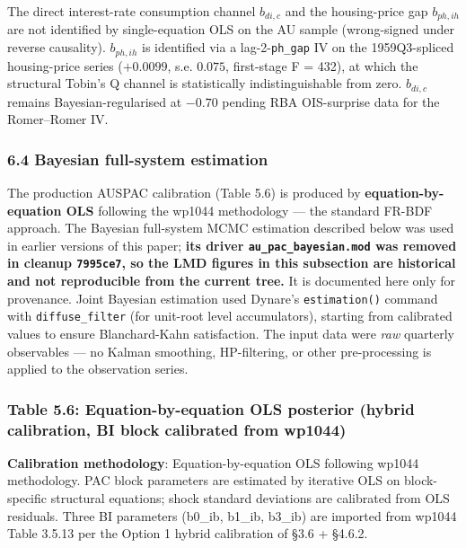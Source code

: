 \documentclass[
]{article}
\begin{document}
The direct interest-rate consumption channel \(b_{di,c}\) and the
housing-price gap \(b_{ph,ih}\) are not identified by single-equation
OLS on the AU sample (wrong-signed under reverse causality).
\(b_{ph,ih}\) is identified via a lag-2-\texttt{ph\_gap} IV on the
1959Q3-spliced housing-price series (\(+0.0099\), s.e. \(0.075\),
first-stage F = 432), at which the structural Tobin's Q channel is
statistically indistinguishable from zero. \(b_{di,c}\) remains
Bayesian-regularised at \(-0.70\) pending RBA OIS-surprise data for the
Romer--Romer IV.

\subsubsection{6.4 Bayesian full-system
estimation}\label{bayesian-full-system-estimation}

The production AUSPAC calibration (Table 5.6) is produced by
\textbf{equation-by-equation OLS} following the wp1044 methodology ---
the standard FR-BDF approach. The Bayesian full-system MCMC estimation
described below was used in earlier versions of this paper; \textbf{its
driver \texttt{au\_pac\_bayesian.mod} was removed in cleanup
\texttt{7995ce7}, so the LMD figures in this subsection are historical
and not reproducible from the current tree.} It is documented here only
for provenance. Joint Bayesian estimation used Dynare's
\texttt{estimation()} command with \texttt{diffuse\_filter} (for
unit-root level accumulators), starting from calibrated values to ensure
Blanchard-Kahn satisfaction. The input data were \emph{raw} quarterly
observables --- no Kalman smoothing, HP-filtering, or other
pre-processing is applied to the observation series.

\subsubsection{Table 5.6: Equation-by-equation OLS posterior (hybrid
calibration, BI block calibrated from
wp1044)}\label{table-5.6-equation-by-equation-ols-posterior-hybrid-calibration-bi-block-calibrated-from-wp1044}

\textbf{Calibration methodology}: Equation-by-equation OLS following
wp1044 methodology. PAC block parameters are estimated by iterative OLS
on block-specific structural equations; shock standard deviations are
calibrated from OLS residuals. Three BI parameters (b0\_ib, b1\_ib,
b3\_ib) are imported from wp1044 Table 3.5.13 per the Option 1 hybrid
calibration of §3.6 + §4.6.2.
\end{document}
